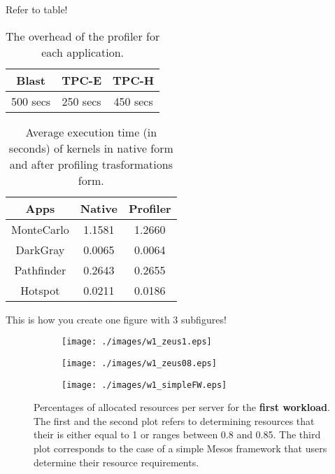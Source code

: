 Refer to table!  
\begin{table}[htb]
        \centering
        \caption{The overhead of the profiler for each application.}
        \label{tbl:profiler-overhead}
        \begin{tabular}{@{}ccc@{}}
                \toprule
                \toprule
                Blast & TPC-E & TPC-H\\
                \midrule
                500 secs & 250 secs & 450 secs\\
                \bottomrule
        \end{tabular}
\end{table}

\begin{table}[h!]
\centering
 \begin{tabular}{||c | c c||} 
 \hline
 Apps & Native & Profiler \\ [0.8ex] 
 \hline\hline
 MonteCarlo & 1.1581 & 1.2660 \\ 
 DarkGray & 0.0065 & 0.0064 \\
 Pathfinder & 0.2643 & 0.2655 \\
 Hotspot & 0.0211 & 0.0186 \\ [1ex]
 \hline
 \end{tabular}
\caption{Average execution time (in seconds) of kernels in native form and after profiling trasformations form.}
\label{table:1}
\end{table}


This is how you create one figure with 3 subfigures!
\begin{figure*}
\centering
\begin{subfigure}[b]{0.74\textwidth}
        \texttt{[image: ./images/w1\_zeus1.eps]}
        \label{fig:w1_zeus1}
\end{subfigure}

\begin{subfigure}[b]{0.74\textwidth}
        \texttt{[image: ./images/w1\_zeus08.eps]}
        \label{fig:w1_zeus08}
\end{subfigure}

\begin{subfigure}[b]{0.74\textwidth}
        \texttt{[image: ./images/w1\_simpleFW.eps]}
        \label{fig:w1_simplefw}
\end{subfigure}
\caption{Percentages of allocated resources per server for the \textbf{first workload}. The first and the second plot refers to \name{} determining resources that their \perfindex{} is either equal to 1 or ranges between 0.8 and 0.85. The third plot corresponds to the case of a simple Mesos framework that users determine their resource requirements.}
\label{fig:first_workload}
\end{figure*}
